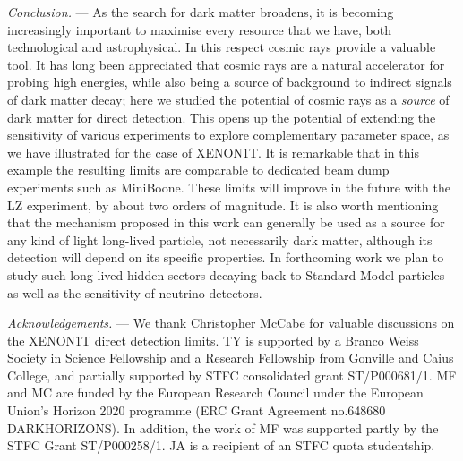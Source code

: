 \documentclass[prl,twocolumn,groupedaddress,nofootinbib, superscriptaddress]{revtex4-1}
\begin{document}
{\it Conclusion.} --- As the search for dark matter broadens, it is becoming increasingly important to maximise every resource that we have, both technological and astrophysical. In this respect cosmic rays provide a valuable tool. It has long been appreciated that cosmic rays are a natural accelerator for probing high energies, while also being a source of background to indirect signals of dark matter decay; here we studied the potential of cosmic rays as a {\it source} of dark matter for direct detection. This opens up the potential of extending the sensitivity of various experiments to explore complementary parameter space, as we have illustrated for the case of XENON1T. It is remarkable that in this example the resulting limits are comparable to dedicated beam dump experiments such as MiniBoone. These limits will improve in the future with the LZ experiment, by about two orders of magnitude. It is also worth mentioning that the mechanism proposed in this work can generally be used as a source for any kind of light long-lived particle, not necessarily dark matter, although its detection will depend on its specific properties. In forthcoming work we plan to study such long-lived hidden sectors decaying back to Standard Model particles as well as the sensitivity of neutrino detectors.


\bigskip
{\it Acknowledgements.} --- We thank Christopher McCabe for valuable discussions on the XENON1T direct detection limits. TY is supported by a Branco Weiss Society in Science Fellowship and a Research Fellowship from Gonville and Caius College, and partially supported by STFC consolidated grant ST/P000681/1.  MF and MC are funded by the European  Research  Council  under  the  European Union's Horizon 2020 programme (ERC Grant Agreement no.648680 DARKHORIZONS).  In addition, the work of MF was supported partly by the STFC Grant ST/P000258/1.  JA is a recipient of an STFC quota studentship.




\end{document}
